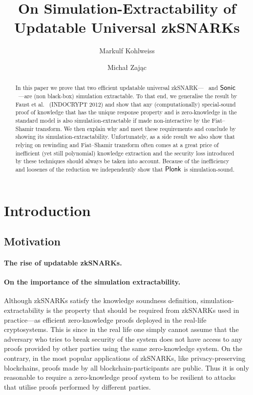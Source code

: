 \let\accentvec\vec \documentclass[runningheads,10pt]{llncs}
\title{On Simulation-Extractability of Updatable Universal zkSNARKs}
\author{Markulf Kohlweiss\inst{1,2} \and Michał Zając\inst{3}} \iflncs{
\institute{University of Edinburgh, Edinburgh, UK \and IOHK \\
\email{mkohlwei@inf.ed.ac.uk} \and Clearmatics, London UK \\
\email{m.p.zajac@gmail.com}} }
\begin{document}
 \sloppy \maketitle

\begin{abstract} 
	In this paper we prove that two efficient updatable universal
	zkSNARK---\plonk{}~\cite{EPRINT:GabWilCio19} and
	${\textnormal{\textsf{Sonic}}}$~\cite{CCS:MBKM19}---are (non black-box) simulation extractable.  To
	that end, we generalise the result by Faust et al.~\cite{INDOCRYPT:FKMV12}
	(INDOCRYPT 2012) and show that any (computationally) special-sound proof of
	knowledge that has the unique response property and is zero-knowledge in the
	standard model is also simulation-extractable if made non-interactive by the
	Fiat--Shamir transform.  We then explain why \plonk{} and \sonic{} meet
	these requirements and conclude by showing its simulation-extractability.
	Unfortunately, as a side result we also show that relying on rewinding and
	Fiat--Shamir transform often comes at a great price of inefficient (yet
	still polynomial) knowledge extraction and the security loss introduced by
	these techniques should always be taken into account.  Because of the
	inefficiency and loosenes of the reduction we independently show that
	$\textnormal{\textsf{Plonk}}{}$ is simulation-sound.  
\end{abstract}

\section{Introduction} \subsection{Motivation} \paragraph{The rise of updatable
zkSNARKs.} \cite{C:GKMMM18} \cite{EC:CHMMVW20} \cite{CCS:MBKM19}
\cite{EPRINT:GabWilCio19} \cite{EPRINT:Gabizon19c} \cite{EPRINT:Lipmaa19a}


\paragraph{On the importance of the simulation extractability.}
Although zkSNARKs satisfy the knowledge soundness definition,
simulation-extractability is the property that should be required from
zkSNARKs used in practice---as efficient zero-knowledge proofs deployed in the
real-life cryptosystems. This is since in the real life one simply cannot
assume that the adversary who tries to break security of the system does not
have access to any proofs provided by other parties using the same
zero-knowledge system. On the contrary, in the most popular applications of
zkSNARKs, like privacy-preserving blockchains, proofs made by all
blockchain-participants are public. Thus it is only reasonable to require 
a zero-knowledge proof system to be resilient to attacks that utilise proofs
performed by different parties.
\end{document}
